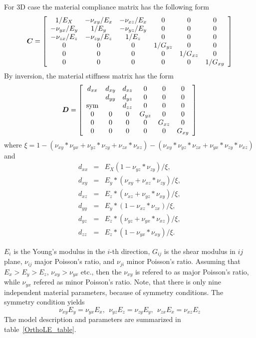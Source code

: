 \documentclass[epsf,a4paper]{article}
\newcommand{\mbf}[1]{\mbox{\boldmath$#1$}}
\begin{document}
For 3D case the material compliance matrix has the following form
\begin{equation}
  \mbf{C}=\left[\begin{array}{cccccc}
      1/E_X & -\nu_{xy}/E_x& -\nu_{xz}/E_x& 0& 0&0\\
      -\nu_{yx}/E_y & 1/E_y& -\nu_{yz}/E_y& 0& 0&0\\
      -\nu_{zx}/E_z & -\nu_{zy}/E_z& 1/E_z& 0& 0&0\\
      0 & 0 & 0 & 1/G_{yz} & 0 & 0\\
      0 & 0 & 0 & 0 & 1/G_{xz} & 0\\
      0 & 0 & 0 & 0 & 0 & 1/G_{xy}
    \end{array}\right]
\end{equation}
By inversion, the material stiffness matrix has the form
\begin{equation}
  \mbf{D}=\left[\begin{array}{cccccc}
      d_{xx} & d_{xy} & d_{xz} & 0 & 0 & 0\\
      & d_{yy} & d_{yz} & 0 & 0 & 0\\
      \rm {sym} & & d_{zz} & 0 & 0 & 0\\
      0 & 0 & 0 & G_{yz} & 0 & 0\\
      0 & 0 & 0 & 0 & G_{xz} & 0\\
      0 & 0 & 0 & 0 & 0 & G_{xy}
    \end{array}\right]
\end{equation}
where $\xi=1-(\nu_{xy}*\nu_{yx}+\nu_{yz}*\nu_{zy}+\nu_{zx}*\nu_{xz})-(\nu_{xy}*\nu_{yz}*\nu_{zx}+\nu_{yx}*\nu_{zy}*\nu_{xz})$ and
\begin{eqnarray}
  d_{xx}&=&E_X(1-\nu_{yz}*\nu_{zy})/\xi,\\
  d_{xy}&=&E_y*(\nu_{xy}+\nu_{xz}*\nu_{zy})/\xi,\\
  d_{xz}&=&E_z*(\nu_{xz}+\nu_{yz}*\nu_{xy})/\xi,\\
  d_{yy}&=&E_y*(1-\nu_{xz}*\nu_{zx})/\xi,\\
  d_{yz}&=&E_z*(\nu_{yz}+\nu_{yx}*\nu_{xz})/\xi,\\
  d_{zz}&=&E_z*(1-\nu_{yx}*\nu_{xy})/\xi.  
\end{eqnarray}


 $E_i$ is the Young's modulus in the $i$-th direction, $G_{ij}$ is the shear modulus in $ij$ plane, $\nu_{ij}$ major Poisson's ratio, and $\nu_{ji}$ minor Poisson's ratio. Assuming that $E_x>E_y>E_z$, $\nu_{xy} > \nu_{yx}$ etc., then the $\nu_{xy}$ is refered to as major Poisson's ratio, while $\nu_{yx}$ refered as minor Poisson's ratio.
Note, that there is only nine independent material parameters,
because of symmetry conditions. The symmetry condition yields
$$\nu_{xy}E_y=\nu_{yx}E_x,\ \ \nu_{yz}E_z=\nu_{zy}E_y,\ \ \nu_{zx}E_x=\nu_{xz}E_z$$
The model description and parameters are summarized
in table~\ref{OrthoLE_table}.
\end{document}
